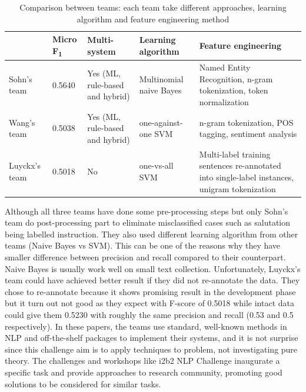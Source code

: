 \begin{table}
\small
\noindent\begin{tabularx}{\textwidth}{llXXX}

\toprule
                    & Micro F\textsubscript{1}        &   Multi-system                              &  Learning algorithm            &   Feature engineering\\ 
\midrule
Sohn's team &  0.5640                & Yes (ML, rule-based and hybrid) &  Multinomial naive Bayes    &  Named Entity Recognition, n-gram tokenization, token normalization \\
Wang's team&  0.5038                & Yes (ML, rule-based and hybrid) & one-against-one SVM        &   n-gram tokenization, POS tagging, sentiment analysis\\
Luyckx's team&  0.5018              & No                                                & one-vs-all SVM                   & Multi-label training sentences re-annotated into single-label instances, unigram tokenization\\	

\bottomrule
\end{tabularx}
\caption{Comparison between teams: each team take different approaches, learning algorithm and feature engineering method}
\label{tab:teams}
\end{table}


Although all three teams have done some pre-processing steps but only Sohn's team do post-processing part to eliminate misclassified cases such as salutation being labelled instruction. They also used different learning algorithm from other teams (Naive Bayes vs SVM). This can be one of the reasons why they have smaller difference between precision and recall compared to their counterpart. Naive Bayes is usually work well on small text collection. Unfortunately, Luyckx's team could have achieved better result if they did not re-annotate the data. They chose to re-annotate because it shows promising result in the development phase but it turn out not good as they expect with F-score of 0.5018 while intact data could give them 0.5230 with roughly the same precision and recall (0.53 and 0.5 respectively). In these papers, the teams use standard, well-known methods in NLP and off-the-shelf packages to implement their systems, and it is not surprise since this challenge aim is to apply techniques to problem, not investigating pure theory. The challenges and workshops like i2b2 NLP Challenge inaugurate a specific task and
provide approaches to research community, promoting good solutions to be considered for similar tasks.\\

